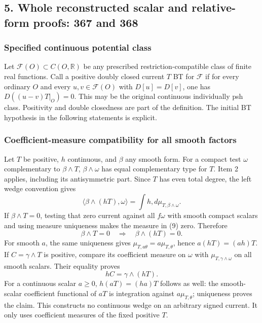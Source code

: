\documentclass[11pt]{article}
\begin{document}
\subsection{5. Whole reconstructed scalar and relative-form proofs: 367 and 368}

\subsubsection{Specified continuous potential class}

Let \(\mathcal F(O)\subset C(O,\mathbb R)\) be any prescribed restriction-compatible class of finite real functions. Call a positive doubly closed current \(T\) BT for \(\mathcal F\) if for every ordinary \(O\) and every \(u,v\in\mathcal F(O)\) with \(D[u]=D[v]\), one has \(D((u-v)T|_O)=0\). This may be the original continuous individually psh class. Positivity and double closedness are part of the definition. The initial BT hypothesis in the following statements is explicit.

\subsubsection{Coefficient-measure compatibility for all smooth factors}

Let \(T\) be positive, \(h\) continuous, and \(\beta\) any smooth form. For a compact test \(\omega\) complementary to \(\beta\wedge T\), \(\beta\wedge\omega\) has equal complementary type for \(T\). Item 2 applies, including its antisymmetric part. Since \(T\) has even total degree, the left wedge convention gives
\[
 \langle\beta\wedge(hT),\omega\rangle
 =\int h,d\mu_{T,\beta\wedge\omega}.\tag{9}
\]
If \(\beta\wedge T=0\), testing that zero current against all \(f\omega\) with smooth compact scalars and using measure uniqueness makes the measure in (9) zero. Therefore
\[
 \beta\wedge T=0\quad\Longrightarrow\quad\beta\wedge(hT)=0.
 \tag{10}
\]
For smooth \(a\), the same uniqueness gives \(\mu_{T,a\theta}=a\mu_{T,\theta}\), hence \(a(hT)=(ah)T\). If \(C=\gamma\wedge T\) is positive, compare its coefficient measure on \(\omega\) with \(\mu_{T,\gamma\wedge\omega}\) on all smooth scalars. Their equality proves
\[
 hC=\gamma\wedge(hT).\tag{11}
\]
For a continuous scalar \(a\geq0\), \(h(aT)=(ha)T\) follows as well: the smooth-scalar coefficient functional of \(aT\) is integration against \(a\mu_{T,\theta}\); uniqueness proves the claim. This constructs no continuous wedge on an arbitrary signed current. It only uses coefficient measures of the fixed positive \(T\).
\end{document}
